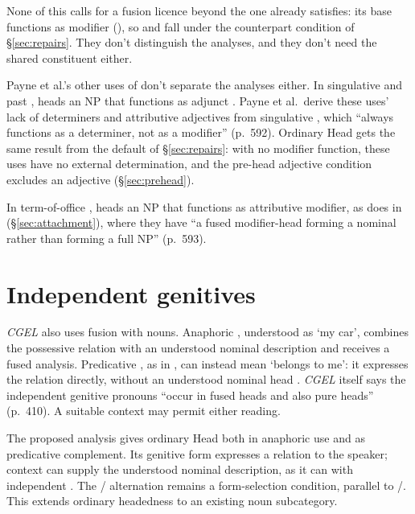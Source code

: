 \documentclass[12pt]{article}
\begin{document}
None of this calls for a fusion licence beyond the one  already satisfies: its base  functions as modifier (), so  and  \citep[586--587]{Payne2007} fall under the counterpart condition of §\ref{sec:repairs}. They don't distinguish the analyses, and they don't need the shared constituent either.

Payne et al.'s other uses of  don't separate the analyses either. In singulative  and past ,  heads an NP that functions as adjunct \citep[584, 592]{Payne2007}. Payne et al.\ derive these uses' lack of determiners and attributive adjectives from singulative , which \enquote{always functions as a determiner, not as a modifier} (p.~592). Ordinary Head gets the same result from the default of §\ref{sec:repairs}: with no modifier function, these uses have no external determination, and the pre-head adjective condition excludes an adjective (§\ref{sec:prehead}).

In term-of-office ,  heads an NP that functions as attributive modifier, as  does in  (§\ref{sec:attachment}), where they have \enquote{a fused modifier-head forming a nominal rather than forming a full NP} (p.~593).

\section{Independent genitives}\label{sec:genitive-head}

\textit{CGEL} also uses fusion with nouns. Anaphoric , understood as \enquote*{my car}, combines the possessive relation with an understood nominal description and receives a fused analysis. Predicative , as in , can instead mean \enquote*{belongs to me}: it expresses the relation directly, without an understood nominal head \citep[410--411, 469--471]{huddleston2002}. \textit{CGEL} itself says the independent genitive pronouns \enquote{occur in fused heads and also pure heads} (p.~410). A suitable context may permit either reading.

The proposed analysis gives  ordinary Head both in anaphoric use and as predicative complement. Its genitive form expresses a relation to the speaker; context can supply the understood nominal description, as it can with independent . The / alternation remains a form-selection condition, parallel to /. This extends ordinary headedness to an existing noun subcategory.
\end{document}
